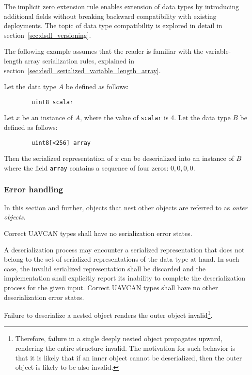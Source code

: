 \begin{remark}
    The implicit zero extension rule enables extension of data types by introducing additional fields
    without breaking backward compatibility with existing deployments.
    The topic of data type compatibility is explored in detail in section~\ref{sec:dsdl_versioning}.

    The following example assumes that the reader is familiar with the variable-length array serialization rules,
    explained in section~\ref{sec:dsdl_serialized_variable_length_array}.

    Let the data type $A$ be defined as follows:

    \begin{verbatim}
        uint8 scalar
    \end{verbatim}

    Let $x$ be an instance of $A$, where the value of \verb|scalar| is 4.
    Let the data type $B$ be defined as follows:

    \begin{verbatim}
        uint8[<256] array
    \end{verbatim}

    Then the serialized representation of $x$ can be deserialized into an instance of $B$ where the field
    \verb|array| contains a sequence of four zeros: $0, 0, 0, 0$.
\end{remark}

\subsubsection{Error handling}\label{sec:dsdl_serialized_error}

In this section and further, objects that nest other objects are referred to as \emph{outer objects}.

Correct UAVCAN types shall have no serialization error states.

A deserialization process may encounter a serialized representation that does not belong to the
set of serialized representations of the data type at hand.
In such case, the invalid serialized representation shall be discarded and the implementation
shall explicitly report its inability to complete the deserialization process for the given input.
Correct UAVCAN types shall have no other deserialization error states.

Failure to deserialize a nested object renders the outer object invalid\footnote{%
    Therefore, failure in a single deeply nested object propagates upward, rendering the entire structure invalid.
    The motivation for such behavior is that it is likely that if an inner object cannot be deserialized,
    then the outer object is likely to be also invalid.
}.

